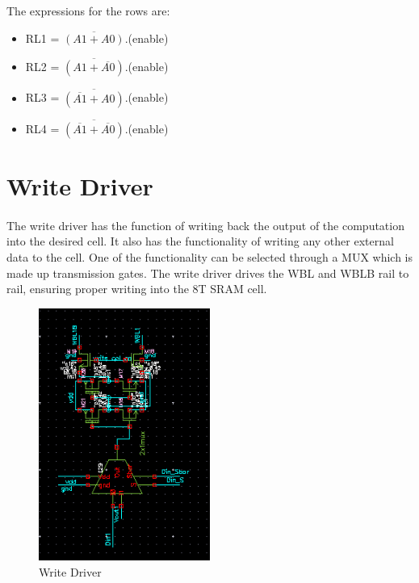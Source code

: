 The expressions for the rows are:

\begin{itemize}
\item RL1 =  $\overline{( A1 +  A0)}$.(enable)
\item RL2 =  $\overline{( A1 + \overline{A0})}$.(enable) 
\item RL3 =  $\overline{(\overline{A1} +  A0)}$.(enable) 
\item RL4 =  $\overline{(\overline{A1} + \overline{A0})}$.(enable)
\end{itemize}

\section{Write Driver}
\paragraph{}

The write driver has the function of writing back the output of the computation into the desired cell. It also has the functionality of writing any other external data to the cell. One of the functionality can be selected through a MUX which is made up transmission gates. The write driver drives the WBL and WBLB rail to rail, ensuring proper writing into the 8T SRAM cell.

\begin{figure}[H]
\centering
\includegraphics[width=0.5\textwidth]{write_driver.png}
\caption{Write Driver}
\label{fig:Figure}
\end{figure}


